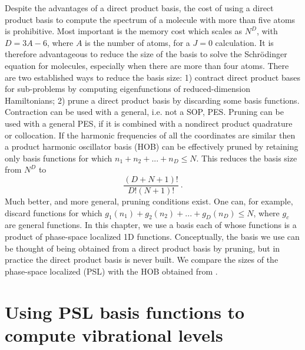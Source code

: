 Despite the  advantages of a direct product basis, the cost of using  a direct product basis to compute     the   spectrum  of   a molecule with more than five atoms is  prohibitive.
Most important is the memory cost which scales as  $N^D$, with $D=3A-6$,  where $A$ is the number 
of atoms, for a $J=0$ calculation.  It is therefore 
advantageous to reduce the size of the basis to solve the Schr\"{o}dinger 
equation for molecules, especially when there are more than four atoms. 
\cite{Bowman2008}
There are two  established ways to reduce the basis size:  1) contract direct product bases for
sub-problems by computing eigenfunctions of reduced-dimension Hamiltonians;\cite{Bacic1989,Carter1988,Henderson1990,Wang2002,Yu2002b} 
  2) prune a direct product basis by discarding some  basis functions.\cite{Carter1986,Carter1997,Poirier2003,Dawes2005,Dawes2006}  
  Contraction can be used
with a general, i.e. not a SOP, PES.   Pruning can be used with a general PES,  if it is combined with a nondirect product quadrature or collocation.\cite{Avila2009,Lauvergnat2010,Avila2011b,Avila2015}
%
If the harmonic frequencies of all the coordinates are similar then a product harmonic oscillator basis (HOB) can be effectively pruned by retaining only basis functions
for which   $n_1+n_2+...+n_D \leq N$.    
  This reduces the basis size  from $N^D$  to
 \begin{equation}\label{Eq.HOBprune}
 \dfrac{\left(D+N+1\right)!}{D!(N+1)!} ~.
 \end{equation}
Much better, and more general, pruning conditions exist.  One can, for example, discard functions for which 
 $g_1(n_1) +g_2(n_2)+...+g_D(n_D) \le N$,  
where $g_c$ are   general functions.\cite{Avila2011b,Halverson2015}    
%
%
In this chapter,    we use a basis each of whose functions is a product of phase-space localized 
1D functions.    Conceptually, the basis we use can be thought of being obtained from 
a direct product basis by pruning, but in practice the direct product basis is never built.   
We compare the sizes of the phase-space localized (PSL) with  the HOB obtained from 
 .  


\section{Using PSL basis functions to compute vibrational levels}\label{2sec2}




